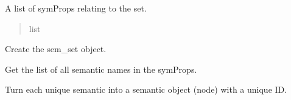 \documentclass[letterpaper,10pt,english]{sphinxmanual}
\begin{document}
\begin{fulllineitems}
\begin{fulllineitems}
\begin{quote}
\begin{description}
\end{description}\end{quote}

\end{fulllineitems}


\begin{fulllineitems}
\label{\detokenize{nodes:nodes.nodeBuilder.Build_sems.symProps}}
\pysigstartsignatures
\pysigline
{}
\pysigstopsignatures
\sphinxAtStartPar
A list of symProps relating to the set.
\begin{quote}\begin{description}
\sphinxAtStartPar
list

\end{description}\end{quote}

\end{fulllineitems}


\begin{fulllineitems}
\label{\detokenize{nodes:nodes.nodeBuilder.Build_sems.build_sems}}
\pysigstartsignatures
\pysiglinewithargsret
{}
{}
{}
\pysigstopsignatures
\sphinxAtStartPar
Create the sem\_set object.

\end{fulllineitems}


\begin{fulllineitems}
\label{\detokenize{nodes:nodes.nodeBuilder.Build_sems.get_sems}}
\pysigstartsignatures
\pysiglinewithargsret
{}
{}
{}
\pysigstopsignatures
\sphinxAtStartPar
Get the list of all semantic names in the symProps.

\end{fulllineitems}


\begin{fulllineitems}
\label{\detokenize{nodes:nodes.nodeBuilder.Build_sems.nodulate}}
\pysigstartsignatures
\pysiglinewithargsret
{}
{}
{}
\pysigstopsignatures
\sphinxAtStartPar
Turn each unique semantic into a semantic object (node) with a unique ID.

\end{fulllineitems}


\end{fulllineitems}
\end{document}
